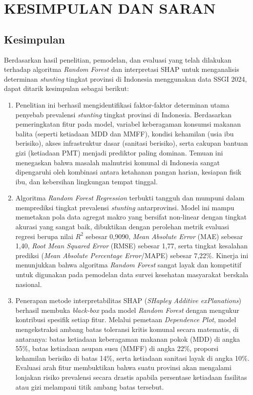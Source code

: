 \newpage
\chapter{KESIMPULAN DAN SARAN} \label{Bab V}

\section{Kesimpulan} \label{V.Kesimpulan}
Berdasarkan hasil penelitian, pemodelan, dan evaluasi yang telah dilakukan terhadap algoritma \textit{Random Forest} dan interpretasi SHAP untuk menganalisis determinan \textit{stunting} tingkat provinsi di Indonesia menggunakan data SSGI 2024, dapat ditarik kesimpulan sebagai berikut:

\begin{enumerate}
    \item Penelitian ini berhasil mengidentifikasi faktor-faktor determinan utama penyebab prevalensi \textit{stunting} tingkat provinsi di Indonesia. Berdasarkan pemeringkatan fitur pada model, variabel keberagaman konsumsi makanan balita (seperti ketiadaan MDD dan MMFF), kondisi kehamilan (usia ibu berisiko), akses infrastruktur dasar (sanitasi berisiko), serta cakupan bantuan gizi (ketiadaan PMT) menjadi prediktor paling dominan. Temuan ini menegaskan bahwa masalah malnutrisi komunal di Indonesia sangat dipengaruhi oleh kombinasi antara ketahanan pangan harian, kesiapan fisik ibu, dan kebersihan lingkungan tempat tinggal.
    
    \item Algoritma \textit{Random Forest Regression} terbukti tangguh dan mumpuni dalam memprediksi tingkat prevalensi \textit{stunting} antarprovinsi. Model ini mampu memetakan pola data agregat makro yang bersifat non-linear dengan tingkat akurasi yang sangat baik, dibuktikan dengan perolehan metrik evaluasi regresi berupa nilai $R^2$ sebesar 0,9090, \textit{Mean Absolute Error} (MAE) sebesar 1,40, \textit{Root Mean Squared Error} (RMSE) sebesar 1,77, serta tingkat kesalahan prediksi (\textit{Mean Absolute Percentage Error}/MAPE) sebesar 7,22\%. Kinerja ini menunjukkan bahwa algoritma \textit{Random Forest} sangat layak dan kompetitif untuk digunakan pada pemodelan data survei kesehatan masyarakat berskala nasional.
  
    \item Penerapan metode interpretabilitas SHAP (\textit{SHapley Additive exPlanations}) berhasil membuka \textit{black-box} pada model \textit{Random Forest} dengan mengukur kontribusi spesifik setiap fitur. Melalui pemetaan \textit{Dependence Plot}, model mengekstraksi ambang batas toleransi kritis komunal secara matematis, di antaranya: batas ketiadaan keberagaman makanan pokok (MDD) di angka 55\%, batas ketiadaan asupan susu (MMFF) di angka 22\%, proporsi kehamilan berisiko di batas 14\%, serta ketiadaan sanitasi layak di angka 10\%. Evaluasi arah fitur membuktikan bahwa suatu provinsi akan mengalami lonjakan risiko prevalensi secara drastis apabila persentase ketiadaan fasilitas atau gizi melampaui titik ambang batas tersebut.
\end{enumerate}

